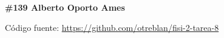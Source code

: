 \documentclass{article}
\begin{document}
\thispagestyle{fancy}
\textbf { \#139 Alberto Oporto Ames }




\vfill
Código fuente: \url{https://github.com/otreblan/fisi-2-tarea-8}
\end{document}
